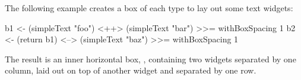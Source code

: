 The following example creates a box of each type to lay out some text
widgets:

\begin{haskellcode}
 b1 <- (simpleText "foo") <++> (simpleText "bar") >>= withBoxSpacing 1
 b2 <- (return b1) <--> (simpleText "baz") >>= withBoxSpacing 1
\end{haskellcode}

The result is an inner horizontal box, , containing two
 widgets separated by one column, laid out on top of
another  widget and separated by one row.
